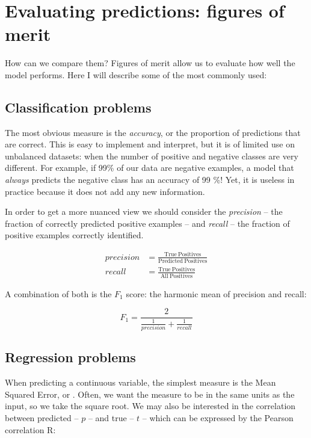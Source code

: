\section{Evaluating predictions: figures of merit}
How can we compare them?
Figures of merit allow us to evaluate how well the model performs.
Here I will describe some of the most commonly used:

\subsection{Classification problems}
The most obvious measure is the \emph{accuracy}, or the proportion of predictions that are correct.
This is easy to implement and interpret, but it is of limited use on unbalanced datasets: when the number of positive and negative classes are very different.
For example, if 99\% of our data are negative examples, a model that \emph{always} predicts the negative class has an accuracy of 99 \%!
Yet, it is useless in practice because it does not add any new information.

In order to get  a more nuanced view we should consider the \emph{precision} -- the fraction of correctly predicted positive examples -- 
and \emph{recall} -- the fraction of positive examples correctly identified.

\begin{align*}
precision &= \frac{\mathrm{True\ Positives}}{\mathrm{Predicted\ Positives}}\\
recall &= \frac{\mathrm{True\ Positives}}{\mathrm{All\ Positives}}
\end{align*}

A combination  of both is the $F_1$ score: the harmonic mean of precision and recall:

\begin{equation*}
F_1 = \frac{2}{\frac{1}{precision} + \frac{1}{recall}}
\end{equation*}

\subsection{Regression problems}
When predicting a continuous variable, the simplest measure is the Mean Squared Error, or \MSE.
Often, we want the measure to be in the same units as the input, so we take the square root.
We may also be interested in the correlation between predicted -- $p$ -- and true -- $t$ -- which can be expressed by the Pearson correlation R:

